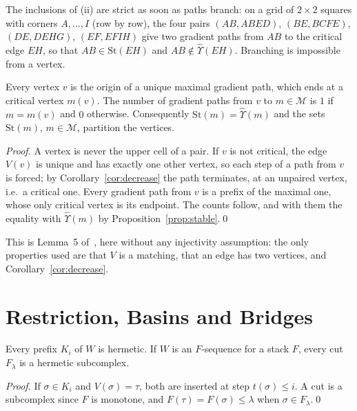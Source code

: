 \documentclass[runningheads]{llncs}
\newcommand{\St}{\mathrm{St}}
\newcommand{\coext}{\widehat{\Upsilon}}
\begin{document}
The inclusions of (ii) are strict as soon as paths branch: on a grid of
$2\times2$ squares with corners $A,\ldots,I$ (row by row), the four pairs
$(AB,ABED)$, $(BE,BCFE)$, $(DE,DEHG)$, $(EF,EFIH)$ give two gradient paths
from $AB$ to the critical edge $EH$, so that $AB\in\St(EH)$ and
$AB\notin\coext(EH)$. Branching is impossible from a vertex.

\begin{theorem}\label{thm:flow}
Every vertex $v$ is the origin of a unique maximal gradient path, which ends
at a critical vertex $m(v)$. The number of gradient paths from $v$ to
$m\in\mathcal{M}$ is $1$ if $m=m(v)$ and $0$ otherwise. Consequently
$\St(m)=\coext(m)$ and the sets $\St(m)$, $m\in\mathcal{M}$, partition the
vertices.
\end{theorem}

\begin{proof}
A vertex is never the upper cell of a pair. If $v$ is not critical, the edge
$V(v)$ is unique and has exactly one other vertex, so each step of a path
from $v$ is forced; by Corollary~\ref{cor:decrease} the path terminates, at
an unpaired vertex, i.e.\ a critical one. Every gradient path from $v$ is a
prefix of the maximal one, whose only critical vertex is its endpoint. The
counts follow, and with them the equality with $\coext(m)$ by
Proposition~\ref{prop:stable}.\qed
\end{proof}

This is Lemma~5 of~\cite{DFRS15}, here without any injectivity assumption:
the only properties used are that $V$ is a matching, that an edge has two
vertices, and Corollary~\ref{cor:decrease}.

\section{Restriction, Basins and Bridges}\label{sec:basins}

\begin{lemma}\label{lem:hermetic}
Every prefix $K_i$ of $W$ is hermetic. If $W$ is an $F$-sequence for a
stack $F$, every cut $F_\lambda$ is a hermetic subcomplex.
\end{lemma}

\begin{proof}
If $\sigma\in K_i$ and $V(\sigma)=\tau$, both are inserted at step
$t(\sigma)\le i$. A cut is a subcomplex since $F$ is monotone, and
$F(\tau)=F(\sigma)\le\lambda$ when $\sigma\in F_\lambda$.\qed
\end{proof}
\end{document}
